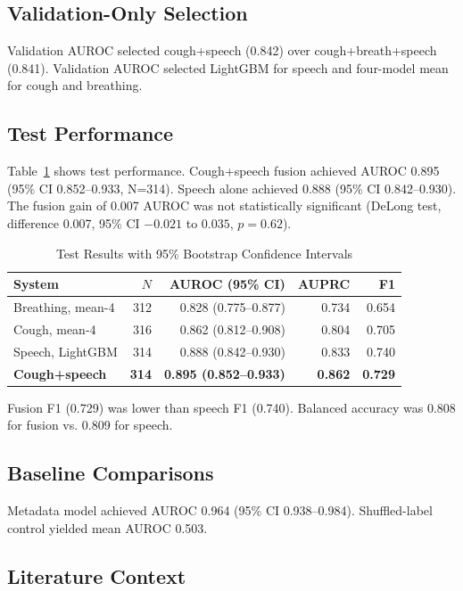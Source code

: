\documentclass[conference]{IEEEtran}
\begin{document}
\subsection{Validation-Only Selection}

Validation AUROC selected cough+speech (0.842) over cough+breath+speech (0.841). Validation AUROC selected LightGBM for speech and four-model mean for cough and breathing.

\subsection{Test Performance}

Table~\ref{tab:results} shows test performance. Cough+speech fusion achieved AUROC 0.895 (95\% CI 0.852--0.933, N=314). Speech alone achieved 0.888 (95\% CI 0.842--0.930). The fusion gain of 0.007 AUROC was not statistically significant (DeLong test, difference 0.007, 95\% CI $-0.021$ to $0.035$, $p=0.62$).

\begin{table}[!t]
\caption{Test Results with 95\% Bootstrap Confidence Intervals}
\label{tab:results}
\centering
\footnotesize
\begin{tabular}{lrrrr}
\toprule
System & $N$ & AUROC (95\% CI) & AUPRC & F1 \\
\midrule
Breathing, mean-4  & 312 & 0.828 (0.775--0.877) & 0.734 & 0.654 \\
Cough, mean-4      & 316 & 0.862 (0.812--0.908) & 0.804 & 0.705 \\
Speech, LightGBM   & 314 & 0.888 (0.842--0.930) & 0.833 & 0.740 \\
\midrule
\textbf{Cough+speech} & \textbf{314} & \textbf{0.895 (0.852--0.933)} & \textbf{0.862} & \textbf{0.729} \\
\bottomrule
\end{tabular}
\end{table}

Fusion F1 (0.729) was lower than speech F1 (0.740). Balanced accuracy was 0.808 for fusion vs. 0.809 for speech.

\subsection{Baseline Comparisons}

Metadata model achieved AUROC 0.964 (95\% CI 0.938--0.984). Shuffled-label control yielded mean AUROC 0.503.

\subsection{Literature Context}
\end{document}
